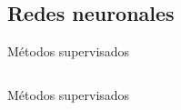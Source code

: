 \subsection{Redes neuronales}
\begin{frame}{Métodos supervisados}
\begin{columns}
\begin{column}{0.9\textwidth}

\end{column}
\end{columns}
\end{frame}

\begin{frame}{Métodos supervisados}
\begin{columns}
\begin{column}{0.9\textwidth}

\end{column}
\end{columns}
\end{frame}
